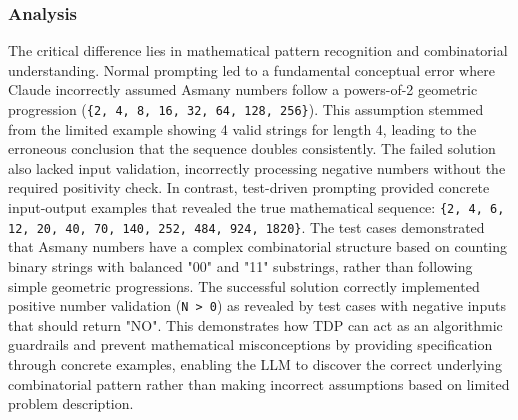 \documentclass{article}
\begin{document}
\subsubsection{Analysis}

The critical difference lies in mathematical pattern recognition and combinatorial understanding. Normal prompting led to a fundamental conceptual error where Claude incorrectly assumed Asmany numbers follow a powers-of-2 geometric progression (\texttt{\{2, 4, 8, 16, 32, 64, 128, 256\}}). This assumption stemmed from the limited example showing 4 valid strings for length 4, leading to the erroneous conclusion that the sequence doubles consistently. The failed solution also lacked input validation, incorrectly processing negative numbers without the required positivity check. In contrast, test-driven prompting provided concrete input-output examples that revealed the true mathematical sequence: \texttt{\{2, 4, 6, 12, 20, 40, 70, 140, 252, 484, 924, 1820\}}. The test cases demonstrated that Asmany numbers have a complex combinatorial structure based on counting binary strings with balanced "00" and "11" substrings, rather than following simple geometric progressions. The successful solution correctly implemented positive number validation (\texttt{N > 0}) as revealed by test cases with negative inputs that should return "NO". This demonstrates how TDP can act as an algorithmic guardrails and prevent mathematical misconceptions by providing specification through concrete examples, enabling the LLM to discover the correct underlying combinatorial pattern rather than making incorrect assumptions based on limited problem description.
\end{document}
